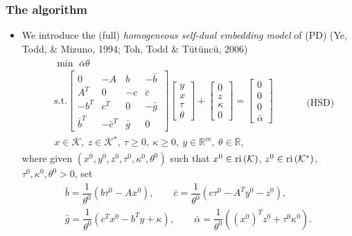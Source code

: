 \documentclass{beamer}
\def\interior{\protect{\textnormal{ri}}}
\begin{document}
\begin{frame}
	\frametitle{The algorithm}
	\begin{itemize}
		\item We introduce the (full) \textit{homogeneous self-dual embedding model} of (PD) (Ye, Todd, \& Mizuno, 1994; Toh, Todd \& T\"ut\"unc\"u, 2006)
		\begin{align*}
		\begin{split}
		& \min \,\, \bar{\alpha}\theta \\
		& \text{s.t.} \begin{bmatrix}
		0 & -A & b & -\bar b\ \\ 
		A^T & 0 & -c & \bar c \\
		-b^T & c^T& 0 & -\bar g \\
		\bar b^T & -\bar c^T & \bar g & 0
		\end{bmatrix}
		\begin{bmatrix}
		y \\ x \\ \tau \\ \theta
		\end{bmatrix} + 
		\begin{bmatrix}
		0 \\ z \\ \kappa \\ 0 
		\end{bmatrix} = 
		\begin{bmatrix}
		0 \\ 0 \\ 0 \\ \bar \alpha
		\end{bmatrix}\\
		& x \in \mathcal{K},\ z \in \mathcal{K}^*,\ \tau \geq 0,\ \kappa\geq 0,\ y \in \mathbb{R}^m,\ \theta \in \mathbb{R}, 
		\end{split} \quad \quad \quad \text{(HSD)}
		\end{align*}
		where given $(x^0, y^0, z^0, \tau^0, \kappa^0, \theta^0)$ such that $x^0 \in \interior \left(\mathcal{K}\right)$, $z^0 \in \interior \left(\mathcal{K}^*\right)$, $\tau^0, \kappa^0, \theta^0 > 0$, set
		\begin{align*}
		\bar b = \dfrac{1}{\theta^0}\left(b\tau^0 - Ax^0\right),\quad\quad  \bar c = \dfrac{1}{\theta^0}\left(c\tau^0 - A^Ty^0 - z^0\right), \\ 
		\bar g = \dfrac{1}{\theta^0}\left(c^T x^0 - b^T y + \kappa\right), \quad\quad  \bar \alpha = \dfrac{1}{\theta^0}\left((x^0)^T z^0 + \tau^0\kappa^0\right).
		\end{align*}
	\end{itemize}
\end{frame}
\end{document}
